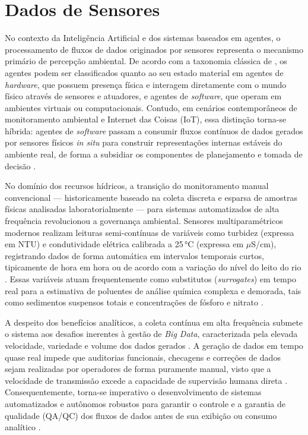 \section{Dados de Sensores}
\label{sec:dados_sensores}

No contexto da Inteligência Artificial e dos sistemas baseados em agentes, o processamento de fluxos de dados originados por sensores representa o mecanismo primário de percepção ambiental. De acordo com a taxonomia clássica de , os agentes podem ser classificados quanto ao seu estado material em agentes de \textit{hardware}, que possuem presença física e interagem diretamente com o mundo físico através de sensores e atuadores, e agentes de \textit{software}, que operam em ambientes virtuais ou computacionais. Contudo, em cenários contemporâneos de monitoramento ambiental e Internet das Coisas (IoT), essa distinção torna-se híbrida: agentes de \textit{software} passam a consumir fluxos contínuos de dados gerados por sensores físicos \textit{in situ} para construir representações internas estáveis do ambiente real, de forma a subsidiar os componentes de planejamento e tomada de decisão \cite{cheng2026, muller1999}.

No domínio dos recursos hídricos, a transição do monitoramento manual convencional --- historicamente baseado na coleta discreta e esparsa de amostras físicas analisadas laboratorialmente \cite{leigh2019framework} --- para sistemas automatizados de alta frequência revolucionou a governança ambiental. Sensores multiparamétricos modernos realizam leituras semi-contínuas de variáveis como turbidez (expressa em NTU) e condutividade elétrica calibrada a 25\,°C (expressa em $\mu$S/cm), registrando dados de forma automática em intervalos temporais curtos, tipicamente de hora em hora ou de acordo com a variação do nível do leito do rio \cite{leigh2019framework}. Essas variáveis atuam frequentemente como substitutos (\textit{surrogates}) em tempo real para a estimativa de poluentes de análise química complexa e demorada, tais como sedimentos suspensos totais e concentrações de fósforo e nitrato \cite{leigh2019framework}.

A despeito dos benefícios analíticos, a coleta contínua em alta frequência submete o sistema aos desafios inerentes à gestão de \textit{Big Data}, caracterizada pela elevada velocidade, variedade e volume dos dados gerados \cite{leigh2019framework}. A geração de dados em tempo quase real impede que auditorias funcionais, checagens e correções de dados sejam realizadas por operadores de forma puramente manual, visto que a velocidade de transmissão excede a capacidade de supervisão humana direta \cite{leigh2019framework}. Consequentemente, torna-se imperativo o desenvolvimento de sistemas automatizados e autônomos robustos para garantir o controle e a garantia de qualidade (QA/QC) dos fluxos de dados antes de sua exibição ou consumo analítico \cite{leigh2019framework}.

